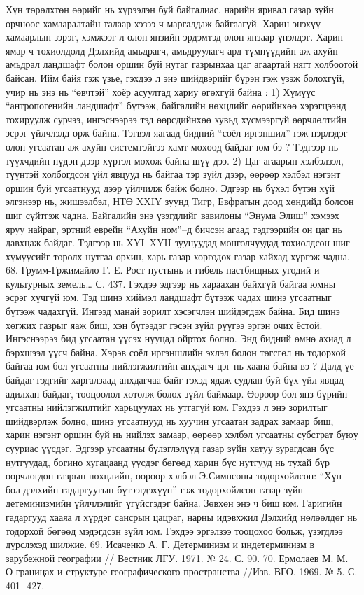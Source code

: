 Хүн төрөлхтөн өөрийг нь хүрээлэн буй байгалиас, нарийн яривал газар зүйн орчноос хамааралтайн талаар хэзээ ч маргалдаж байгаагүй. Харин энэхүү хамаарлын зэрэг, хэмжээг л олон янзийн эрдэмтэд олон янзаар үнэлдэг. Харин ямар ч тохиолдолд Дэлхийд амьдрагч, амьдруулагч ард түмнүүдийн аж ахуйн амьдрал ландшафт болон оршин буй нутаг газрынхаа цаг агаартай нягт холбоотой байсан.
Ийм байя гэж үзье, гэхдээ л энэ шийдвэрийг бүрэн гэж үзэж болохгүй, учир нь энэ нь “өвчтэй” хоёр асуултад хариу өгөхгүй байна : 1) Хүмүүс “антропогенийн ландшафт” бүтээж, байгалийн нөхцлийг өөрийнхөө хэрэгцээнд тохируулж сурчээ, ингэснээрээ тэд өөрсдийнхөө хувьд хүсмээргүй өөрчлөлтийн эсрэг үйлчлэлд орж байна. Тэгвэл яагаад бидний “соёл иргэншил” гэж нэрлэдэг олон угсаатан аж ахуйн системтэйгээ хамт мөхөөд байдаг юм бэ ? Тэдгээр нь түүхчдийн нүдэн дээр хүртэл мөхөж байна шүү дээ. 2) Цаг агаарын хэлбэлзэл, түүнтэй холбогдсон үйл явцууд нь байгаа тэр зүйл дээр, өөрөөр хэлбэл нэгэнт оршин буй угсаатнууд дээр үйлчилж байж болно. Эдгээр нь бүхэл бүтэн хүй элгэнээр нь, жишээлбэл, НТӨ XXIY зуунд Тигр, Евфратын доод хөндийд болсон шиг сүйтгэж чадна. Байгалийн энэ үзэгдлийг вавилоны “Энума Элиш” хэмээх яруу найраг, эртний еврейн “Ахуйн ном”–д бичсэн агаад тэдгээрийн он цаг нь давхцаж байдаг. Тэдгээр нь XYI–XYII зуунуудад монголчуудад тохиолдсон шиг хүмүүсийг төрөлх нутгаа орхин, харь газар хоргодох газар хайхад хүргэж чадна. 68. Грумм-Гржимайло Г. Е. Рост пустынь и гибель пастбищных угодий и культурных земель… С. 437.
Гэхдээ эдгээр нь хараахан байхгүй байгаа юмны эсрэг хүчгүй юм. Тэд шинэ хиймэл ландшафт бүтээж чадах шинэ угсаатныг бүтээж чадахгүй. Ингээд манай зорилт хэсэгчлэн шийдэгдэж байна. Бид шинэ хөгжих газрыг яаж биш, хэн бүтээдэг гэсэн зүйл рүүгээ эргэн очих ёстой. Ингэснээрээ бид угсаатан үүсэх нууцад ойртох болно.
Энд бидний өмнө ахиад л бэрхшээл үүсч байна. Хэрэв соёл иргэншлийн эхлэл болон төгсгөл нь тодорхой байгаа юм бол угсаатны нийлэгжилтийн анхдагч цэг нь хаана байна вэ ? Далд үе байдаг гэдгийг харгалзаад анхдагчаа байг гэхэд ядаж судлан буй бүх үйл явцад адилхан байдаг, тооцоолол хөтөлж болох зүйл баймаар. Өөрөөр бол янз бүрийн угсаатны нийлэгжилтийг харьцуулах нь утгагүй юм.
Гэхдээ л энэ зорилтыг шийдвэрлэж болно, шинэ угсаатнууд нь хуучин угсаатан задрах замаар биш, харин нэгэнт оршин буй нь нийлэх замаар, өөрөөр хэлбэл угсаатны субстрат буюу сууриас үүсдэг. Эдгээр угсаатны бүлэглэлүүд газар зүйн хатуу зурагдсан бүс нутгуудад, богино хугацаанд үүсдэг бөгөөд харин бүс нутгууд нь тухай бүр өөрчлөгдөн газрын нөхцлийн, өөрөөр хэлбэл Э.Симпсоны тодорхойлсон: “Хүн бол дэлхийн гадаргуугын бүтээгдэхүүн” гэж тодорхойлсон газар зүйн детеминизмийн үйлчлэлийг үгүйсгэдэг байна. Зөвхөн энэ ч биш юм. Гаригийн гадаргууд хааяа л хүрдэг сансрын цацраг, нарны идэвхжил Дэлхийд нөлөөлдөг нь тодорхой бөгөөд мэдэгдсэн зүйл юм. Гэхдээ эргэлзээ тооцохоо больж, үзэгдлээ дүрслэхэд шилжие. 69. Исаченко А. Г. Детерминизм и индетерминизм в зарубежной географии // Вестник ЛГУ. 1971. № 24. С. 90. 70. Ермолаев М. М. О границах и структуре географического пространства //Изв. ВГО. 1969. № 5. С. 401- 427.
